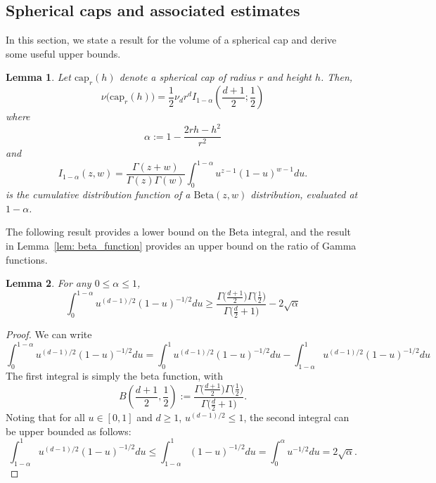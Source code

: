 \documentclass{report}
\newcommand{\1}{\mathbf{1}}
\theoremstyle{alden}
\theoremstyle{aldenthm}
\newtheorem{lemma}{Lemma}
\theoremstyle{definition}
\theoremstyle{remark}
\begin{document}
\subsection{Spherical caps and associated estimates}
\label{subsec:caps}
In this section, we state a result for the volume of a spherical cap and derive some 
useful upper bounds. 
\begin{lemma}
	\label{lem: volume_of_spherical_cap}
	Let $\mathrm{cap}_r(h)$ denote a spherical cap of radius $r$ and height $h$. Then, 
	\begin{equation*}
	\nu\bigl( \mathrm{cap}_r(h)  \bigr) = \frac{1}{2} \nu_d r^d I_{1 - \alpha}\left(\frac{d + 1}{2}; \frac{1}{2}\right)
	\end{equation*}
	where
	\begin{equation*}
	\alpha := 1 - \frac{2 r h - h^2}{r^2}
	\end{equation*}
	and
	\begin{equation*}
	I_{1 - \alpha}(z,w) = \frac{\Gamma(z + w)}{\Gamma(z) \Gamma(w)} \int_{0}^{1 - \alpha} u^{z - 1} (1 - u)^{w - 1} du.
	\end{equation*}
	is the cumulative distribution function of a $\mathrm{Beta}(z,w)$ distribution, evaluated at $1 - \alpha$. 
\end{lemma}
The following result provides a lower bound on the Beta integral, and the result in Lemma~\ref{lem: beta_function} provides
an upper bound on the ratio of Gamma functions. 
\begin{lemma}
	\label{lem: beta_integral}
	For any $0 \leq \alpha \leq 1$,
	\begin{equation*}
	\int_{0}^{1 - \alpha}u^{(d-1)/2}(1 - u)^{-1/2}du \geq \frac{\Gamma\bigl(\frac{d + 1}{2}\bigr)\Gamma\bigl(\frac{1}{2}\bigr)}{ \Gamma\bigl(\frac{d}{2}+ 1\bigr)} - 2\sqrt{\alpha}
	\end{equation*}
\end{lemma}
\begin{proof}
	We can write 
	\begin{equation*}
	\int_{0}^{1 - \alpha}u^{(d-1)/2}(1 - u)^{-1/2}du = \int_{0}^{1}u^{(d-1)/2}(1 - u)^{-1/2}du - \int_{1 - \alpha}^{1}u^{(d-1)/2}(1 - u)^{-1/2}du
	\end{equation*}
	The first integral is simply the beta function, with
	\begin{equation*}
	B(\frac{d+1}{2},\frac{1}{2}) := \frac{\Gamma\bigl(\frac{d + 1}{2}\bigr)\Gamma\bigl(\frac{1}{2}\bigr)}{ \Gamma\bigl(\frac{d}{2}+ 1\bigr)}.
	\end{equation*}
	Noting that for all $u \in [0,1]$ and $d \geq 1$, $u^{(d - 1)/2} \leq 1$, the second integral can be upper bounded as follows:
	\begin{equation*}
	\int_{1 - \alpha}^{1}u^{(d-1)/2}(1 - u)^{-1/2}du \leq \int_{1 - \alpha}^{1}(1 - u)^{-1/2}du = \int_{0}^{\alpha} u^{-1/2}du = 2\sqrt{\alpha}.
	\end{equation*}
\end{proof}
\end{document}

